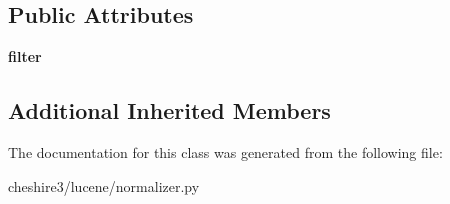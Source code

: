 \subsection*{Public Attributes}
\begin{DoxyCompactItemize}
\item 
\hypertarget{classcheshire3_1_1lucene_1_1normalizer_1_1_stop_filter_normalizer_a9f524d64f8d76da6cd6f1ebfed92650b}{{\bfseries filter}}\label{classcheshire3_1_1lucene_1_1normalizer_1_1_stop_filter_normalizer_a9f524d64f8d76da6cd6f1ebfed92650b}

\end{DoxyCompactItemize}
\subsection*{Additional Inherited Members}


The documentation for this class was generated from the following file\-:\begin{DoxyCompactItemize}
\item 
cheshire3/lucene/normalizer.\-py\end{DoxyCompactItemize}
